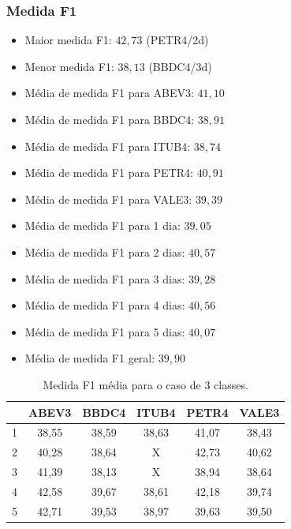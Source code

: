 \documentclass[grad,numbers]{coppe}
\begin{document}
	 			\subsubsection{Medida F1}
					\begin{itemize}
		 				\item Maior medida F1: $42,73$ (PETR4/2d)
		 				\item Menor medida F1: $38,13$ (BBDC4/3d)
		 				\item Média de medida F1 para ABEV3: $41,10$
		 				\item Média de medida F1 para BBDC4: $38,91$
		 				\item Média de medida F1 para ITUB4: $38,74$
		 				\item Média de medida F1 para PETR4: $40,91$
		 				\item Média de medida F1 para VALE3: $39,39$
		 				\item Média de medida F1 para 1 dia: $39,05$
		 				\item Média de medida F1 para 2 dias: $40,57$
		 				\item Média de medida F1 para 3 dias: $39,28$
		 				\item Média de medida F1 para 4 dias: $40,56$
		 				\item Média de medida F1 para 5 dias: $40,07$
		 				\item Média de medida F1 geral: $39,90$
		 			\end{itemize}
		 			\begin{table}[h]
		 				\caption{Medida F1 média para o caso de 3 classes.}
		 				\label{tab:3c_f1_analysis}
		 				\centering
		 				{\footnotesize
		 					\begin{tabular}{|c|c|c|c|c|c|}
		 						\hline
		 						\diagbox[linewidth=0.2pt, width=\dimexpr \textwidth/10+2\tabcolsep\relax, height=0.8cm]{Dias}{Ativo}
		 						& ABEV3 & BBDC4 & ITUB4 & PETR4 & VALE3\\
		 						\hline
		 						1 & 38,55 & 38,59 & 38,63 & 41,07 & 38,43 \\
		 						2 & 40,28 & 38,64 & X     & 42,73 & 40,62 \\
		 						3 & 41,39 & 38,13 & X     & 38,94 & 38,64 \\
		 						4 & 42,58 & 39,67 & 38,61 & 42,18 & 39,74 \\
		 						5 & 42,71 & 39,53 & 38,97 & 39,63 & 39,50 \\
		 						\hline
		 				\end{tabular}}
		 			\end{table}
	 			\newpage
\end{document}
